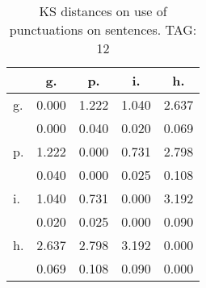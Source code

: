 \begin{table}[h!]
\begin{center}
\begin{tabular}{| l | c | c | c | c |}\hline
 & g. & p. & i. & h. \\\hline
g. & 0.000  & 1.222  & 1.040  & 2.637 \\\hline
 & 0.000  & 0.040  & 0.020  & 0.069 \\\hline
p. & 1.222  & 0.000  & 0.731  & 2.798 \\\hline
 & 0.040  & 0.000  & 0.025  & 0.108 \\\hline
i. & 1.040  & 0.731  & 0.000  & 3.192 \\\hline
 & 0.020  & 0.025  & 0.000  & 0.090 \\\hline
h. & 2.637  & 2.798  & 3.192  & 0.000 \\\hline
 & 0.069  & 0.108  & 0.090  & 0.000 \\\hline
\end{tabular}
\caption{KS distances on use of punctuations on sentences. TAG: 12}
\end{center}
\end{table}